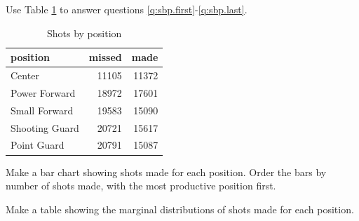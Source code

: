 \documentclass[letterpaper]{exam}
\begin{document}
\begin{questions}
{        Use Table \ref{tab:sbp} to answer questions \ref{q:sbp.first}-\ref{q:sbp.last}.

        \begin{table}[H]
          \centering
          \begin{tabular}{lrr}
            \toprule
            position       & missed & made \\
            \midrule
            Center         & 11105  & 11372 \\
            Power Forward  & 18972  & 17601 \\
            Small Forward  & 19583  & 15090 \\
            Shooting Guard & 20721  & 15617 \\
            Point Guard    & 20791  & 15087 \\
            \bottomrule
          \end{tabular}
          \caption{Shots by position}
          \label{tab:sbp}
        \end{table}
      }

      \question[5] Make a bar chart showing shots made for each position.  Order
        the bars by number of shots made, with the most productive position first.
        \label{q:sbp.first}

      \question[5] Make a table showing the marginal distributions of shots made
      for each position.

      \question 
        \label{q:sbp.last}
      
      \newpage

      \question
        \label{q:draft}


\end{questions}
\end{document}
